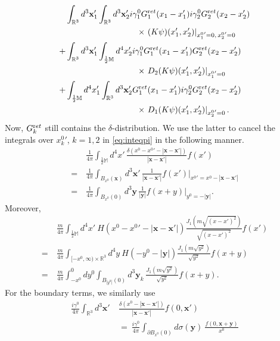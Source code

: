 \documentclass[b5paper,draft,openbib,12pt]{memoir}
\newcommand{\R}{\mathbb{R}}
\newcommand{\M}{\mathbb{M}}
\newcommand{\vx}{\mathbf{x}}
\newcommand{\vy}{\mathbf{y}}
\newcommand{\ret}{{\textup ret}}
\begin{document}
\begin{align}
  &\int_{\R^3} d^3 \vx_1' \int_{\R^3} d^3 \vx_2'  i \gamma_1^0 G_1^\ret(x_1-x_1') i \gamma_2^0 G_2^\ret(x_2-x_2')\\
  &\hspace{3cm}\times  \left.(K \psi)(x_1',x_2') \right|_{{x_1^0}' = 0,\, {x_2^0}' = 0}\nonumber\\
+ &\int_{\R^3} d^3 \vx_1' \int_{\frac{1}{2} \M} d^4 x_2'  i \gamma_1^0 G_1^\ret(x_1-x_1') G_2^\ret(x_2-x_2')  \\
&\hspace{3cm}\times \left.D_2(K \psi)(x_1',x_2') \right|_{{x_1^0}' = 0}\nonumber\\
 +&\int_{\frac{1}{2} \M} d^4 x_1' \int_{\R^3} d^3 \vx_2'  G_1^\ret(x_1-x_1')  i \gamma_2^0 G_2^\ret(x_2-x_2') \\
&\hspace{3cm}\times \left.D_1 (K \psi)(x_1',x_2') \right|_{{x_2^0}' = 0}.
\label{eq:boundaryterms}
\end{align}
Now, $G_k^\ret$ still contains the $\delta$-distribution. We use the latter to cancel the integrals over ${x_k^0}'$, $k=1,2$ in \eqref{eq:inteqpi} in the following manner.
\begin{align}
	&\frac{1}{4\pi} \int_{\tfrac{1}{2}\M} d^4 x' \, \frac{\delta(x^0-{x^0}'-|\vx-\vx'|)}{|\vx-\vx'|} f(x')\\
= ~&\frac{1}{4\pi} \int_{B_{x^0}(\vx)} d^3 \vx' \, \frac{1}{|\vx-\vx'|} f(x')|_{{x^0}'=x^0-|\vx-\vx'|}\nonumber\\
= ~&\frac{1}{4\pi} \int_{B_{x^0}(0)} d^3 \vy\, \frac{1}{|\vy|} f(x +y)|_{y^0=-|\vy|}.
\end{align}
Moreover,
\begin{align}
	&\frac{m}{4\pi} \int_{\tfrac{1}{2}\M} \!\! d^4 x' ~ H(x^0 - {x^0}' - |\vx-\vx'|) \frac{J_1(m\sqrt{(x-x')^2})}{\sqrt{(x-x')^2}} f(x')\nonumber\\
= ~& \frac{m}{4\pi} \int_{[-x^0,\infty) \times \R^3} \!\!\!\! d^4 y ~ H(-y^0- |\vy|) \frac{J_1(m\sqrt{y^2})}{\sqrt{y^2}} f(x +y)\nonumber\\
= ~& \frac{m}{4\pi} \int_{-x^0}^0 dy^0 \int_{B_{|y^0|}(0)} d^3 \vy_k \, \frac{J_1(m\sqrt{y^2})}{\sqrt{y^2}} f(x+y).
\end{align}
For the boundary terms, we similarly use
\begin{align}
   \frac{i \gamma^0}{4\pi} \int_{\R^3}d^3 \vx'& ~ \frac{\delta(x^0-|\vx-\vx'|)}{|\vx-\vx'|}f(0,\vx') \\
   &~=~ \frac{i \gamma^0}{4\pi} \int_{\partial B_{x^0}(0)}d\sigma(\vy) ~ \frac{f(0,\vx+\vy)}{x^0}
  \end{align}
\end{document}
